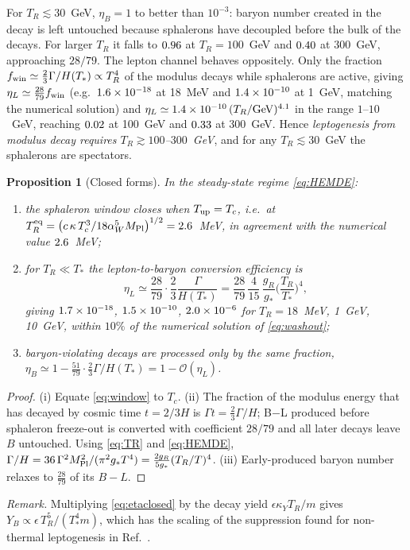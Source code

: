 \documentclass[11pt]{article}
\newtheorem{proposition}{Proposition}
\newcommand{\MP}{M_{\rm Pl}}
\begin{document}
For $T_R\lesssim30$~GeV, $\eta_B=1$ to better than $10^{-3}$: baryon number created in the decay is left untouched because sphalerons have decoupled before the bulk of the decays. For larger $T_R$ it falls to $0.96$ at $T_R=100$~GeV and $0.40$ at $300$~GeV, approaching $28/79$. The lepton channel behaves oppositely. Only the fraction $f_{\rm win}\simeq\tfrac23\Gamma/H(T_*)\propto T_R^4$ of the modulus decays while sphalerons are active, giving $\eta_L\simeq\tfrac{28}{79}f_{\rm win}$ (e.g.\ $1.6\times10^{-18}$ at 18~MeV and $1.4\times10^{-10}$ at 1~GeV, matching the numerical solution) and $\eta_L\simeq1.4\times10^{-10}\,(T_R/\mathrm{GeV})^{4.1}$ in the range $1$--$10$~GeV, reaching $0.02$ at 100~GeV and $0.33$ at 300~GeV. Hence \emph{leptogenesis from modulus decay requires $T_R\gtrsim100$--$300$~GeV}, and for any $T_R\lesssim30$~GeV the sphalerons are spectators.
\begin{proposition}[Closed forms]\label{prop:closed}
In the steady-state regime \eqref{eq:HEMDE}:
\begin{enumerate}
\item[(i)] the sphaleron window closes when $T_{\rm up}=T_c$, i.e.\ at $T_R^{\rm eq}=\big(c\,\kappa\,T_c^3/18\alpha_W^5\MP\big)^{1/2}=\TReqclosed$~MeV, in agreement with the numerical value $2.6$~MeV;
\item[(ii)] for $T_R\ll T_*$ the lepton-to-baryon conversion efficiency is
\begin{equation}
\eta_L\simeq\frac{28}{79}\cdot\frac23\frac{\Gamma}{H(T_*)}=\frac{28}{79}\,\frac{4}{15}\,\frac{g_R}{g_*}\Big(\frac{T_R}{T_*}\Big)^4,\label{eq:etaclosed}
\end{equation}
giving $1.7\times10^{-18}$, $1.5\times10^{-10}$, $2.0\times10^{-6}$ for $T_R=18$~MeV, 1~GeV, 10~GeV, within $10\%$ of the numerical solution of \eqref{eq:washout};
\item[(iii)] baryon-violating decays are processed only by the same fraction, $\eta_B\simeq1-\tfrac{51}{79}\cdot\tfrac23\Gamma/H(T_*)=1-\mathcal O(\eta_L)$.
\end{enumerate}
\end{proposition}
\begin{proof}
(i) Equate \eqref{eq:window} to $T_c$. (ii) The fraction of the modulus energy that has decayed by cosmic time $t=2/3H$ is $\Gamma t=\tfrac23\Gamma/H$; B$-$L produced before sphaleron freeze-out is converted with coefficient $28/79$ and all later decays leave $B$ untouched. Using \eqref{eq:TR} and \eqref{eq:HEMDE}, $\Gamma/H=36\,\Gamma^2\MP^2/(\pi^2g_*T^4)=\tfrac{2g_R}{5g_*}(T_R/T)^4$. (iii) Early-produced baryon number relaxes to $\tfrac{28}{79}$ of its $B-L$.
\end{proof}
\noindent\emph{Remark.} Multiplying \eqref{eq:etaclosed} by the decay yield $\epsilon\kappa_YT_R/m$ gives $Y_B\propto\epsilon\,T_R^5/(T_*^4m)$, which has the scaling of the suppression found for non-thermal leptogenesis in Ref.~\cite{GHKO:2026}.
\end{document}
